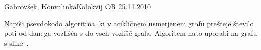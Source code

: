 \begin{naloga}{Gabrovšek, Konvalinka}{Kolokvij OR 25.11.2010}
\begin{vprasanje}
Napiši psevdokodo algoritma,
ki v acikličnem usmerjenem grafu prešteje število poti
od danega vozlišča $s$ do vseh vozlišč grafa.
Algoritem nato uporabi na grafu s slike~\fig.

\begin{slika}
\pgfslika
{}
\end{slika}
\end{vprasanje}
\begin{odgovor}
\end{odgovor}
\end{naloga}
